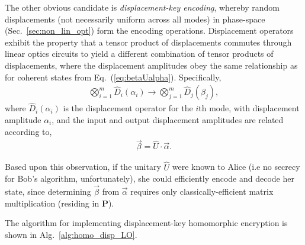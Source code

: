 \documentclass[aps, rmp, twocolumn, amsmath, amssymb, nofootinbib, superscriptaddress, longbibliography, floatfix, table-of-contents, eqsecnum]{revtex4-1}
\begin{document}
The other obvious candidate is \textit{displacement-key encoding}, whereby random displacements (not necessarily uniform across all modes) in phase-space (Sec.~\ref{sec:non_lin_opt}) form the encoding operations. Displacement operators exhibit the property that a tensor product of displacements commutes through linear optics circuits to yield a different combination of tensor products of displacements, where the displacement amplitudes obey the same relationship as for coherent states from Eq.~(\ref{eq:betaUalpha}). Specifically,
\begin{align}
\bigotimes_{i=1}^m \hat{D}_i(\alpha_i) \to \bigotimes_{j=1}^m \hat{D}_j(\beta_j),
\end{align}
where $\hat{D}_i(\alpha_i)$ is the displacement operator for the $i$th mode, with displacement amplitude $\alpha_i$, and the input and output displacement amplitudes are related according to,
\begin{align}
\vec\beta = \hat{U}\cdot\vec\alpha.
\end{align}

Based upon this observation, if the unitary $\hat{U}$ were known to Alice (i.e no secrecy for Bob's algorithm, unfortunately), she could efficiently encode and decode her state, since determining $\vec\beta$ from $\vec\alpha$ requires only classically-efficient matrix multiplication (residing in \textbf{P}).

The algorithm for implementing displacement-key homomorphic encryption is shown in Alg.~\ref{alg:homo_disp_LO}.
\end{document}
